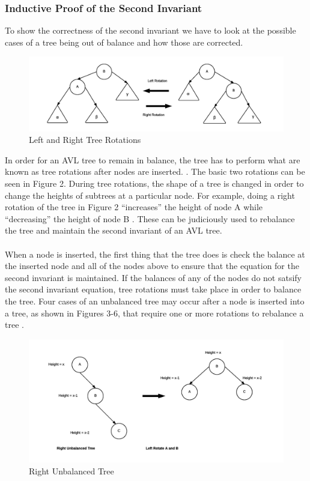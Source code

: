 \documentclass[12pt]{article}
\begin{document}
\subsubsection*{Inductive Proof of the Second Invariant}
To show the correctness of the second invariant we have to look at the possible
cases of a tree being out of balance and how those are corrected.
\begin{figure}[h]
\caption{Left and Right Tree Rotations}
\includegraphics[width=15cm]{tree_rotations.png}
\centering
\end{figure}
\noindent
In order for an AVL tree to remain in balance, the tree has to
perform what are known as tree rotations after nodes are inserted.
\cite{wiki:avl}.
The basic two rotations can be seen in Figure 2.  During tree rotations, the
shape of a tree is changed in order to change the heights of subtrees
at a particular node.  For example, doing a right rotation of the tree in
Figure 2 ``increases'' the height of node A while ``decreasing'' the height of
node B \cite{wiki:tree-rotations}.  These can be judiciously used to rebalance
the tree and maintain the second invariant of an AVL tree.\\
\\
When a node is inserted, the first thing that the tree does is check
the balance at the inserted node and all of the nodes above to
ensure that the equation for the second invariant is maintained.  If the
balances of any of the nodes do not satsify the second invariant equation, tree
rotations must take place in order to balance the tree.  
Four cases of an unbalanced tree may occur after a node is inserted into a tree,
as shown in Figures 3-6, that require one or more
rotations to rebalance a tree \cite{tutorialspoint:avl}.
\begin{figure}[h]
\caption{Right Unbalanced Tree}
\includegraphics[width=15cm]{right_unbalanced_tree.png}
\centering
\end{figure}
\end{document}
